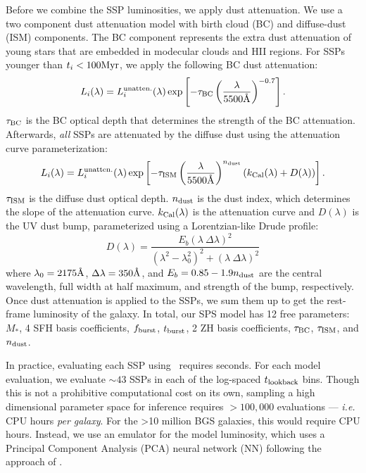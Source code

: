 Before we combine the SSP luminosities, we apply dust attenuation.
We use a two component \cite{charlot2000} dust attenuation model with birth
cloud (BC) and diffuse-dust (ISM) components. 
The BC component represents the extra dust attenuation of young stars that are
embedded in modecular clouds and HII regions. 
For SSPs younger than $t_i < 100{\rm Myr}$, we apply the
following BC dust attenuation: 
\begin{equation}
    L_i(\lambda) = L_i^{\rm unatten.}(\lambda) \exp\left[-\tau_{\rm BC} \left(
    \frac{\lambda}{5500\AA} \right)^{-0.7} \right].
\end{equation}
$\tau_{\rm BC}$ is the BC optical depth that determines the strength of the BC
attenuation. 
Afterwards, {\em all} SSPs are attenuated by the diffuse dust using the
\cite{kriek2013} attenuation curve parameterization: 
\begin{equation}
    L_i(\lambda) = L_i^{\rm unatten.}(\lambda) \exp\left[-\tau_{\rm ISM} \left(
    \frac{\lambda}{5500\AA} \right)^{n_{\rm dust}} \left(k_{\rm Cal}(\lambda) +
    D(\lambda) \right) \right].
\end{equation}
$\tau_{\rm ISM}$ is the diffuse dust optical depth.
$n_{\rm dust}$ is the \cite{calzetti2001} dust index, which determines the
slope of the attenuation curve. 
$k_{\rm Cal}(\lambda)$ is the \cite{calzetti2001} attenuation curve and
$D(\lambda)$ is the UV dust bump, parameterized using a Lorentzian-like Drude 
profile:
\begin{equation}
    D(\lambda) = \frac{E_b(\lambda~\Delta \lambda)^2}{(\lambda^2 -
    \lambda_0^2)^2 + (\lambda~\Delta \lambda)^2}
\end{equation}
where $\lambda_0 = 2175 \AA$, $\Delta \lambda = 350\AA$, and 
$E_b=0.85 - 1.9 n_{\rm dust}$ are the central wavelength, full width at half
maximum, and strength of the bump, respectively. 
Once dust attenuation is applied to the SSPs, we sum them up to get the
rest-frame luminosity of the galaxy. 
In total, our SPS model has 12 free parameters: $M_*$, 4 SFH basis
coefficients, $f_{\rm burst}$, $t_{\rm burst}$, 2 ZH basis coefficients,
$\tau_{\rm BC}$, $\tau_{\rm ISM}$, and $n_{\rm dust}$. 


In practice, evaluating each SSP using \fsps~requires  seconds. 
For each model evaluation, we evaluate $\sim 43$ SSPs in each of the log-spaced
$t_{\rm lookback}$ bins. 
Though this is not a prohibitive computational cost on its own, sampling a
high dimensional parameter space for inference requires $>100,000$ evaluations
--- \emph{i.e.}  CPU hours \emph{per galaxy}. 
For the >10 million BGS galaxies, this would require 
CPU hours. 
Instead, we use an emulator for the model luminosity, which uses a Principal
Component Analysis (PCA) neural network (NN) following the approach of
\cite{alsing2019}.

